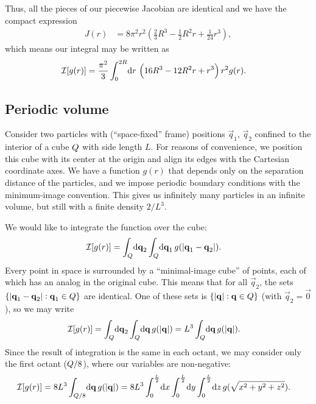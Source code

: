 Thus, all the pieces of our piecewise Jacobian are identical and we have the compact expression
\begin{align}
	J(r)
	&= 8 \pi^2 r^2 \left( \frac{2}{3} R^3 - \frac{1}{2} R^2 r + \frac{1}{24} r^3 \right),
			\label{eq:radial-spherical-jacobian}
\end{align}
which means our integral may be written as
\begin{align}
	\mathcal{I}[g(r)]
	&= \frac{\pi^2}{3} \int_0^{2 R}\! \dif r \, \left( 16 R^3 - 12 R^2 r + r^3 \right) r^2 g(r).
\end{align}


\subsection{Periodic volume}

Consider two particles with (``space-fixed'' frame) positions $\vec{q}_1$, $\vec{q}_2$ confined to the interior of a cube $Q$ with side length $L$.
For reasons of convenience, we position this cube with its center at the origin and align its edges with the Cartesian coordinate axes.
We have a function $g(r)$ that depends only on the separation distance of the particles, and we impose periodic boundary conditions with the minimum-image convention.
This gives us infinitely many particles in an infinite volume, but still with a finite density $2/L^3$.

We would like to integrate the function over the cube:
\begin{align}
	\mathcal{I}[g(r)]
	&= \int_\cube\! \dif \vec{q}_2 \int_\cube\! \dif \vec{q}_1 \, g(\abs[0]{\vec{q}_1 - \vec{q}_2}).
\end{align}
Every point in space is surrounded by a ``minimal-image cube'' of points, each of which has an analog in the original cube.
This means that for all $\vec{q}_2$, the sets $\{ \abs[0]{\bm{\mathbf{q}}_1 - \bm{\mathbf{q}}_2} : \bm{\mathbf{q}}_1 \in Q \}$ are identical.
One of these sets is $\{ \abs[0]{\bm{\mathbf{q}}} : \bm{\mathbf{q}} \in Q \}$ (with $\vec{q}_2 = \vec{0}$), so we may write
\begin{align}
	\mathcal{I}[g(r)]
	&= \int_\cube\! \dif \vec{q}_2 \int_\cube\! \dif \vec{q} \, g(\abs[0]{\vec{q}})
	= L^3 \int_\cube\! \dif \vec{q} \, g(\abs[0]{\vec{q}}).
\end{align}
Since the result of integration is the same in each octant, we may consider only the first octant ($Q/8$), where our variables are non-negative:
\begin{align*}
	\mathcal{I}[g(r)]
	&= 8 L^3 \int_{\cube/8}\! \dif \vec{q} \, g(\abs[0]{\vec{q}})
	= 8 L^3 \int_0^{\frac{L}{2}}\! \dif x \int_0^{\frac{L}{2}}\! \dif y \int_0^{\frac{L}{2}}\! \dif z \, g(\sqrt{x^2 + y^2 + z^2}).
\end{align*}

